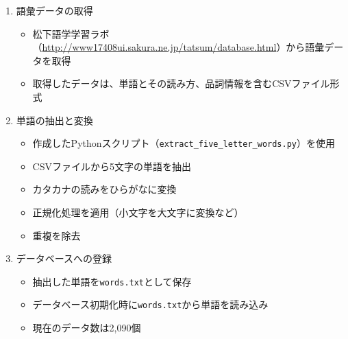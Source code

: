 \documentclass[a4j]{ujarticle}
\begin{document}
\begin{enumerate}
  \item 語彙データの取得
  \begin{itemize}
    \item 松下語学学習ラボ（\url{http://www17408ui.sakura.ne.jp/tatsum/database.html}）から語彙データを取得
    \item 取得したデータは、単語とその読み方、品詞情報を含むCSVファイル形式
  \end{itemize}
  
  \item 単語の抽出と変換
  \begin{itemize}
    \item 作成したPythonスクリプト（\texttt{extract\_five\_letter\_words.py}）を使用
    \item CSVファイルから5文字の単語を抽出
    \item カタカナの読みをひらがなに変換
    \item 正規化処理を適用（小文字を大文字に変換など）
    \item 重複を除去
  \end{itemize}
  
  \item データベースへの登録
  \begin{itemize}
    \item 抽出した単語を\texttt{words.txt}として保存
    \item データベース初期化時に\texttt{words.txt}から単語を読み込み
    \item 現在のデータ数は2,090個
  \end{itemize}
\end{enumerate}
\end{document}
